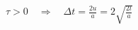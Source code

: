 \documentclass[border=2.5pt]{standalone}
\begin{document}
$\displaystyle \tau>0\quad\Longrightarrow\quad\boxed{\Delta t=\frac{2u}{a}=2\sqrt{\frac{2l}{a}}}$
\end{document}
